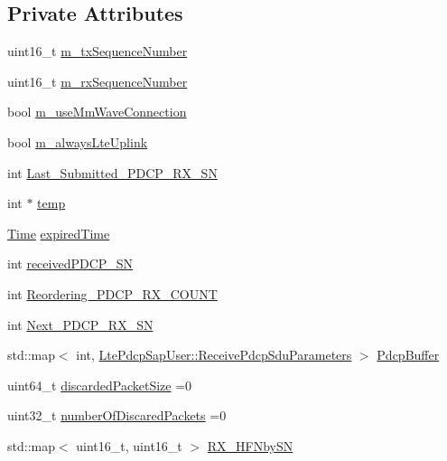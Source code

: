 \subsection*{Private Attributes}
\begin{DoxyCompactItemize}
\item 
uint16\+\_\+t \hyperlink{classns3_1_1McUePdcp_a40f14de1c02f288a87aa5f70501cf31e}{m\+\_\+tx\+Sequence\+Number}
\item 
uint16\+\_\+t \hyperlink{classns3_1_1McUePdcp_aa6a0c17d882c9b646ed631235c7d6ee1}{m\+\_\+rx\+Sequence\+Number}
\item 
bool \hyperlink{classns3_1_1McUePdcp_ae995f7a56173ed7e2ba8f215c928e5a4}{m\+\_\+use\+Mm\+Wave\+Connection}
\item 
bool \hyperlink{classns3_1_1McUePdcp_add1fd75af318fec889e06a47f4407be7}{m\+\_\+always\+Lte\+Uplink}
\item 
int \hyperlink{classns3_1_1McUePdcp_a3706f4ac613b70145c22b7b03649db6b}{Last\+\_\+\+Submitted\+\_\+\+P\+D\+C\+P\+\_\+\+R\+X\+\_\+\+SN}
\item 
int $\ast$ \hyperlink{classns3_1_1McUePdcp_ac36d25965be4d2fedf504d1ef93dd696}{temp}
\item 
\hyperlink{classns3_1_1Time}{Time} \hyperlink{classns3_1_1McUePdcp_a35e4829c509b15878ddf114faee30a7a}{expired\+Time}
\item 
int \hyperlink{classns3_1_1McUePdcp_a87a21da01ea037ef1146091164f1f3f5}{received\+P\+D\+C\+P\+\_\+\+SN}
\item 
int \hyperlink{classns3_1_1McUePdcp_a3afa49adcb23a91496bfe00575cf0c53}{Reordering\+\_\+\+P\+D\+C\+P\+\_\+\+R\+X\+\_\+\+C\+O\+U\+NT}
\item 
int \hyperlink{classns3_1_1McUePdcp_aea27a607c319349dabbf1fba9a9a2efc}{Next\+\_\+\+P\+D\+C\+P\+\_\+\+R\+X\+\_\+\+SN}
\item 
std\+::map$<$ int, \hyperlink{structns3_1_1LtePdcpSapUser_1_1ReceivePdcpSduParameters}{Lte\+Pdcp\+Sap\+User\+::\+Receive\+Pdcp\+Sdu\+Parameters} $>$ \hyperlink{classns3_1_1McUePdcp_aaca29474fb58d037d727e503c44490b5}{Pdcp\+Buffer}
\item 
uint64\+\_\+t \hyperlink{classns3_1_1McUePdcp_ae7935800f033c5e63ec66e18c6c91776}{discarded\+Packet\+Size} =0
\item 
uint32\+\_\+t \hyperlink{classns3_1_1McUePdcp_a2d97086fdd2e34fb5543e9599725b087}{number\+Of\+Discared\+Packets} =0
\item 
std\+::map$<$ uint16\+\_\+t, uint16\+\_\+t $>$ \hyperlink{classns3_1_1McUePdcp_aeb903cf6e9c21639ec4c447cc63f91c3}{R\+X\+\_\+\+H\+F\+Nby\+SN}

\end{DoxyCompactItemize}
